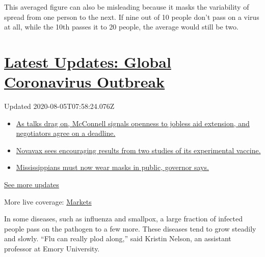 This averaged figure can also be misleading because it masks the
variability of spread from one person to the next. If nine out of 10
people don't pass on a virus at all, while the 10th passes it to 20
people, the average would still be two.

\hypertarget{latest-updates-global-coronavirus-outbreak}{%
\section{\texorpdfstring{\href{https://www.nytimes.com/2020/08/04/world/coronavirus-cases.html?action=click\&pgtype=Article\&state=default\&region=MAIN_CONTENT_1\&context=storylines_live_updates}{Latest
Updates: Global Coronavirus
Outbreak}}{Latest Updates: Global Coronavirus Outbreak}}\label{latest-updates-global-coronavirus-outbreak}}

Updated 2020-08-05T07:58:24.076Z

\begin{itemize}
\tightlist
\item
  \href{https://www.nytimes.com/2020/08/04/world/coronavirus-cases.html?action=click\&pgtype=Article\&state=default\&region=MAIN_CONTENT_1\&context=storylines_live_updates\#link-762df92}{As
  talks drag on, McConnell signals openness to jobless aid extension,
  and negotiators agree on a deadline.}
\item
  \href{https://www.nytimes.com/2020/08/04/world/coronavirus-cases.html?action=click\&pgtype=Article\&state=default\&region=MAIN_CONTENT_1\&context=storylines_live_updates\#link-1228a480}{Novavax
  sees encouraging results from two studies of its experimental
  vaccine.}
\item
  \href{https://www.nytimes.com/2020/08/04/world/coronavirus-cases.html?action=click\&pgtype=Article\&state=default\&region=MAIN_CONTENT_1\&context=storylines_live_updates\#link-794484ed}{Mississippians
  must now wear masks in public, governor says.}
\end{itemize}

\href{https://www.nytimes.com/2020/08/04/world/coronavirus-cases.html?action=click\&pgtype=Article\&state=default\&region=MAIN_CONTENT_1\&context=storylines_live_updates}{See
more updates}

More live coverage:
\href{https://www.nytimes.com/live/2020/08/04/business/stock-market-today-coronavirus?action=click\&pgtype=Article\&state=default\&region=MAIN_CONTENT_1\&context=storylines_live_updates}{Markets}

In some diseases, such as influenza and smallpox, a large fraction of
infected people pass on the pathogen to a few more. These diseases tend
to grow steadily and slowly. ``Flu can really plod along,'' said Kristin
Nelson, an assistant professor at Emory University.

